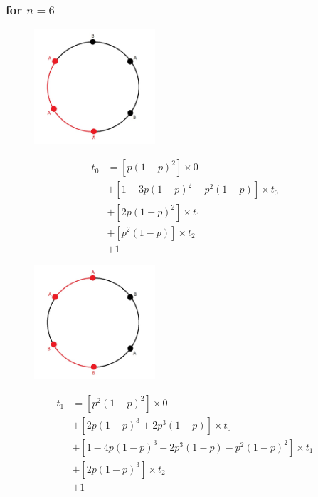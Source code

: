 \documentclass[]{book}
\theoremstyle{definition}
\begin{document}
\subsubsection{for $n = 6$}
\begin{figure}[H]
    \centering
    \includegraphics[width=0.4\textwidth]{figures/n60.jpg}
    \caption{}
\end{figure}
\begin{equation}
\begin{split}
    t_0 &= \left[ p \left( 1-p \right)^2 \right] \times 0 \\
    &+ \left[ 1 - 3p\left( 1-p \right)^2 - p^2\left( 1-p\right) \right] \times t_0 \\
    &+ \left[ 2p\left( 1-p \right)^2 \right] \times t_1 \\
    &+ \left[ p^2 \left( 1-p \right) \right] \times t_2 \\
    &+ 1
\end{split}
\end{equation}


\begin{figure}[H]
    \centering
    \includegraphics[width=0.4\textwidth]{figures/n61.jpg}
    \caption{}
\end{figure}
\begin{equation}
\begin{split}
    t_1 &= \left[ p^2 \left( 1-p \right)^2 \right] \times 0 \\
    &+ \left[ 2p\left( 1-p \right)^3 + 2p^3\left( 1-p \right) \right] \times t_0 \\
    &+ \left[ 1 - 4p\left( 1-p \right)^3 - 2p^3\left( 1-p \right) - p^2\left( 1-p \right)^ 2 \right] \times t_1 \\
    &+ \left[ 2p \left( 1-p \right)^3 \right] \times t_2 \\
    &+ 1
\end{split}
\end{equation}
\end{document}

